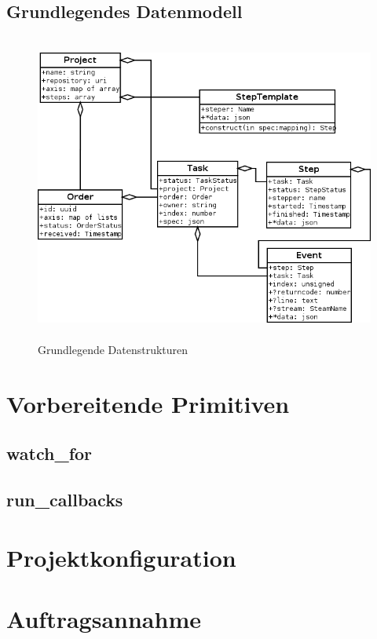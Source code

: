 \subsection{Grundlegendes Datenmodell}


\begin{figure}[ht] 
  \label{fig:datenstrukturen}
  \begin{center}
      \includegraphics[height=4in]{imageinput/datenstrukturen-step-templates.png}
  \end{center}
  \caption{Grundlegende Datenstrukturen}
\end{figure}




\section{Vorbereitende Primitiven}
\subsection{watch\_for}
\subsection{run\_callbacks}

\section{Projektkonfiguration}

\section{Auftragsannahme}

